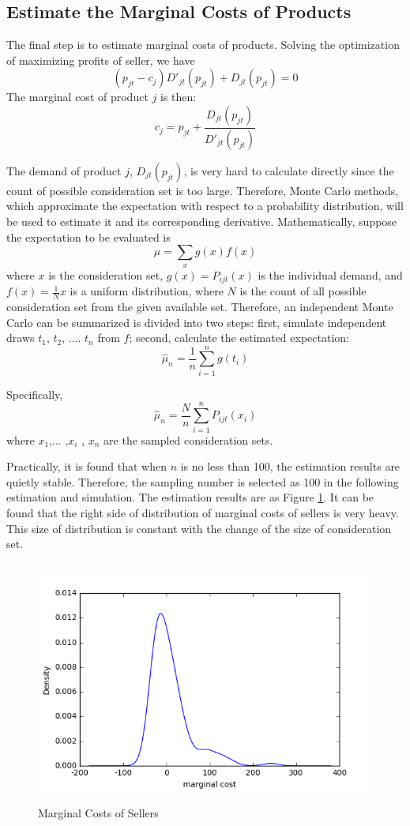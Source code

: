\documentclass{article}
\begin{document}

\subsection{Estimate the Marginal Costs of Products}
The final step is to estimate marginal costs of products. Solving the optimization of maximizing profits of seller, we have
$$
(p_{jt}-c_j)D'_{jt}(p_{jt}) + D_{jt}(p_{jt}) = 0
$$
The marginal cost of product $j$ is then:
$$
c_j = p_{jt} + \frac{D_{jt}(p_{jt})}{D'_{jt}(p_{jt})}
$$
 
The demand of product $j$, $D_{jt}(p_{jt})$, is very hard to calculate directly since the count of possible consideration set is too large. Therefore, Monte Carlo methods, which approximate the expectation with respect to a probability distribution, will be used to estimate it and its corresponding derivative. Mathematically, suppose the expectation to be evaluated is 
$$
\mu = \sum_{x}g(x)f(x)
$$
where $x$ is the consideration set, $g(x)= P_{ijt}(x)$ is the individual demand, and $f(x)=\frac{1}{N}x$ is a uniform distribution, where $N$ is the count of all possible consideration set from the given available set. Therefore, an independent Monte Carlo can be summarized is divided into two steps: first, simulate independent draws $t_1$, $t_2$, .... $t_n$ from $f$; second, calculate the estimated expectation:
$$
\hat{\mu}_n = \frac{1}{n} \sum_{i=1}^{n} g(t_i)
$$

Specifically,
$$
\hat{\mu}_n =  \frac{N}{n} \sum_{i=1}^{n} P_{ijt}(x_i)
$$
where $x_1$,... ,$x_i$ , $x_n$ are the sampled consideration sets. 

Practically, it is found that when $n$ is no less than 100, the estimation results are quietly stable. Therefore, the sampling number is selected as 100 in the following estimation and simulation. The estimation results are as Figure \ref{mc}. It can be found that the right side of distribution of marginal costs of sellers is very heavy. This size of distribution is constant with the change of the size of consideration set. 
\begin{figure}[H]
\centering
\includegraphics[width=12cm, height=8cm]{graphs/mc.png}
\caption{\label{mc}Marginal Costs of Sellers}
\end{figure}
\end{document}
